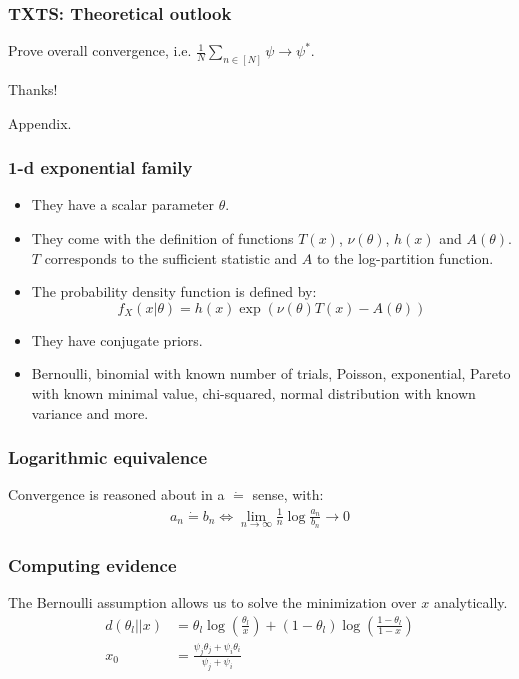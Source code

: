 \documentclass[aspectratio=43]{beamer}
\newcommand{\deq}{\dot{=}}
\begin{document}
\begin{frame}
\frametitle{TXTS: Theoretical outlook}
Prove overall convergence, i.e. $\frac{1}{N}\sum_{n \in [N]} \psi \rightarrow \psi^*$.
\end{frame}

\begin{frame}
Thanks!
\end{frame}

\appendix

\begin{frame}
Appendix.
\end{frame}

\begin{frame}
\frametitle{1-d exponential family}
\begin{itemize}
  \item They have a scalar parameter $\theta$.
  \item They come with the definition of functions $T(x)$, $\nu(\theta)$, $h(x)$ and $A(\theta)$. $T$ corresponds to the sufficient statistic and $A$ to the log-partition function.
  \item The probability density function is defined by:
    \[f_X(x|\theta) = h(x) \exp(\nu(\theta) T(x) - A(\theta))\]
  \item They have conjugate priors.
  \item Bernoulli, binomial with known number of trials, Poisson,
      exponential, Pareto with known minimal value, chi-squared, normal
      distribution with known variance and more.
\end{itemize}
\end{frame}

\begin{frame}
\frametitle{Logarithmic equivalence}
Convergence is reasoned about in a $\deq$ sense, with:
\begin{align}
  a_n \deq b_n \Leftrightarrow \lim_{n \rightarrow
  \infty}\frac{1}{n}\log{\frac{a_n}{b_n}} \rightarrow 0
\end{align}
\end{frame}

\begin{frame}
\frametitle{Computing evidence}
The Bernoulli assumption allows us to solve the minimization over $x$ analytically.
\begin{align}
  d(\theta_l||x) &= \theta_l \log(\frac{\theta_l}{x}) + (1-\theta_l) \log(\frac{1-\theta_l}{1-x}) \label{eq:bernoulli_kl} \\
  x_0 &= \frac{\psi_j\theta_j + \psi_i\theta_i}{\psi_j + \psi_i}
\end{align}
\end{frame}
\end{document}
